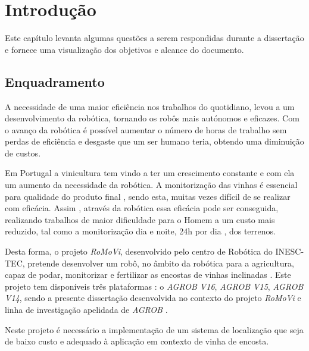 \chapter{Introdução} \label{chap:introdução}
Este capítulo levanta algumas questões a serem respondidas durante a dissertação e fornece uma  visualização dos objetivos e alcance do documento.

\section{Enquadramento} \label{sec:enquadramento}
A necessidade de uma maior eficiência nos trabalhos do quotidiano, levou a um desenvolvimento da robótica, tornando os robôs mais autónomos e eficazes. Com o avanço da robótica é possível aumentar o número de horas de trabalho sem perdas de eficiência e desgaste que um ser humano teria, obtendo uma diminuição de custos.

Em Portugal a vinicultura tem vindo a ter um crescimento constante e com ela um aumento da necessidade da robótica. A monitorização das vinhas é essencial para qualidade do produto final , sendo esta, muitas vezes difícil de se realizar com eficácia. Assim , através da robótica essa eficácia pode ser conseguida, realizando trabalhos de maior dificuldade para o Homem a um custo mais reduzido, tal como a monitorização dia e noite, 24h por dia , dos terrenos. 

Desta forma, o projeto \textit{RoMoVi}, desenvolvido pelo centro de Robótica do INESC-TEC, pretende desenvolver um robô, no âmbito da robótica para a agricultura, capaz de podar, monitorizar e fertilizar as encostas de vinhas inclinadas \cite{Mendes2016}. Este projeto tem disponíveis três plataformas : o \textit{AGROB V16}, \textit{AGROB V15}, \textit{AGROB V14}, sendo a presente dissertação desenvolvida no contexto do projeto \textit{RoMoVi} e linha de investigação apelidada de \textit{AGROB} \cite{RN32}.

Neste projeto é necessário a implementação de um sistema de localização que seja de baixo custo e adequado à aplicação em contexto de vinha de encosta.

